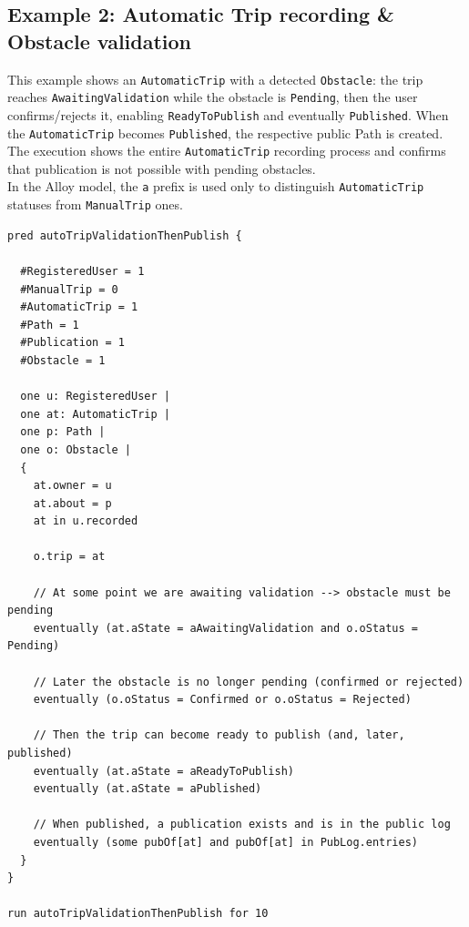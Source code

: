 \subsection{Example 2: Automatic Trip recording \& Obstacle validation}
\noindent

This example shows an \texttt{AutomaticTrip} with a detected \texttt{Obstacle}: the trip reaches \texttt{AwaitingValidation} while the obstacle is \texttt{Pending}, then the user confirms/rejects it, enabling \texttt{ReadyToPublish} and eventually \texttt{Published}. When the \texttt{AutomaticTrip} becomes \texttt{Published}, the respective public Path is created. The execution shows the entire \texttt{AutomaticTrip} recording process and confirms that publication is not possible with pending obstacles. \\In the Alloy model, the \texttt{a} prefix is used only to distinguish \texttt{AutomaticTrip} statuses from \texttt{ManualTrip} ones.
\begin{lstlisting}[language=alloy]
pred autoTripValidationThenPublish {
  
  #RegisteredUser = 1
  #ManualTrip = 0
  #AutomaticTrip = 1
  #Path = 1
  #Publication = 1
  #Obstacle = 1

  one u: RegisteredUser |
  one at: AutomaticTrip |
  one p: Path |
  one o: Obstacle |
  {
    at.owner = u
    at.about = p
    at in u.recorded

    o.trip = at

    // At some point we are awaiting validation --> obstacle must be pending 
    eventually (at.aState = aAwaitingValidation and o.oStatus = Pending)

    // Later the obstacle is no longer pending (confirmed or rejected)
    eventually (o.oStatus = Confirmed or o.oStatus = Rejected)

    // Then the trip can become ready to publish (and, later, published)
    eventually (at.aState = aReadyToPublish)
    eventually (at.aState = aPublished)

    // When published, a publication exists and is in the public log
    eventually (some pubOf[at] and pubOf[at] in PubLog.entries)
  }
}

run autoTripValidationThenPublish for 10
\end{lstlisting}

